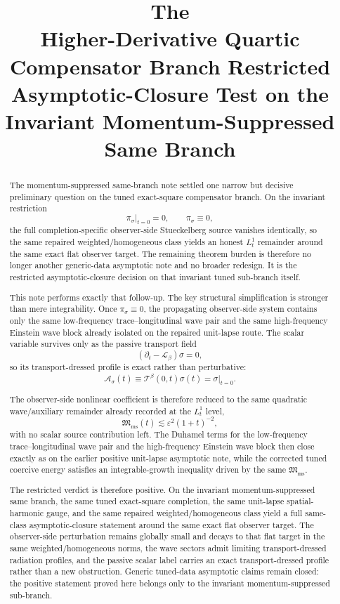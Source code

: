 \documentclass[11pt]{article}
\title{\textbf{The \TheoryName{}}\\[0.4em]
\large Higher-Derivative Quartic Compensator Branch Restricted Asymptotic-Closure Test on the Invariant Momentum-Suppressed Same Branch}
\author{}
\date{}
\newcommand{\Ell}{\mathcal{L}}
\begin{document}
\maketitle

\begin{abstract}
The momentum-suppressed same-branch note settled one narrow but decisive preliminary question on the tuned exact-square compensator branch. On the invariant restriction
\[
\pi_\sigma|_{t=0}=0,
\qquad
\pi_\sigma\equiv 0,
\]
the full completion-specific observer-side Stueckelberg source vanishes identically, so the same repaired weighted/homogeneous class yields an honest \(L_t^1\) remainder around the same exact flat observer target. The remaining theorem burden is therefore no longer another generic-data asymptotic note and no broader redesign. It is the restricted asymptotic-closure decision on that invariant tuned sub-branch itself.

This note performs exactly that follow-up. The key structural simplification is stronger than mere integrability. Once \(\pi_\sigma\equiv 0\), the propagating observer-side system contains only the same low-frequency trace--longitudinal wave pair and the same high-frequency Einstein wave block already isolated on the repaired unit-lapse route. The scalar variable survives only as the passive transport field
\[
(\partial_t-\Ell_\beta)\sigma=0,
\]
so its transport-dressed profile is exact rather than perturbative:
\[
\mathcal A_\sigma(t)\equiv \mathcal T^\beta(0,t)\sigma(t)=\sigma|_{t=0}.
\]

The observer-side nonlinear coefficient is therefore reduced to the same quadratic wave/auxiliary remainder already recorded at the \(L_t^1\) level,
\[
\mathfrak M_{\mathrm{ms}}(t)
\lesssim
\varepsilon^2(1+t)^{-2},
\]
with no scalar source contribution left. The Duhamel terms for the low-frequency trace--longitudinal wave pair and the high-frequency Einstein wave block then close exactly as on the earlier positive unit-lapse asymptotic note, while the corrected tuned coercive energy satisfies an integrable-growth inequality driven by the same \(\mathfrak M_{\mathrm{ms}}\).

The restricted verdict is therefore positive. On the invariant momentum-suppressed same branch, the same tuned exact-square completion, the same unit-lapse spatial-harmonic gauge, and the same repaired weighted/homogeneous class yield a full same-class asymptotic-closure statement around the same exact flat observer target. The observer-side perturbation remains globally small and decays to that flat target in the same weighted/homogeneous norms, the wave sectors admit limiting transport-dressed radiation profiles, and the passive scalar label carries an exact transport-dressed profile rather than a new obstruction. Generic tuned-data asymptotic claims remain closed: the positive statement proved here belongs only to the invariant momentum-suppressed sub-branch.
\end{abstract}
\end{document}
